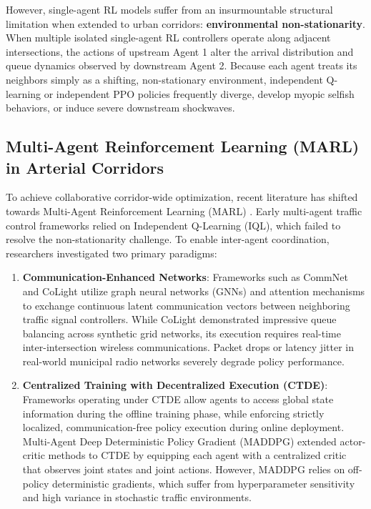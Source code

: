 However, single-agent RL models suffer from an insurmountable structural limitation when extended to urban corridors: \textbf{environmental non-stationarity}. When multiple isolated single-agent RL controllers operate along adjacent intersections, the actions of upstream Agent 1 alter the arrival distribution and queue dynamics observed by downstream Agent 2. Because each agent treats its neighbors simply as a shifting, non-stationary environment, independent Q-learning or independent PPO policies frequently diverge, develop myopic selfish behaviors, or induce severe downstream shockwaves.

\subsection{Multi-Agent Reinforcement Learning (MARL) in Arterial Corridors}
To achieve collaborative corridor-wide optimization, recent literature has shifted towards Multi-Agent Reinforcement Learning (MARL) \cite{ref_mappo2022}. Early multi-agent traffic control frameworks relied on Independent Q-Learning (IQL), which failed to resolve the non-stationarity challenge. To enable inter-agent coordination, researchers investigated two primary paradigms:
\begin{enumerate}
    \item \textbf{Communication-Enhanced Networks}: Frameworks such as CommNet \cite{ref_sukhbaatar2016} and CoLight \cite{ref_wei2019colight} utilize graph neural networks (GNNs) and attention mechanisms to exchange continuous latent communication vectors between neighboring traffic signal controllers. While CoLight demonstrated impressive queue balancing across synthetic grid networks, its execution requires real-time inter-intersection wireless communications. Packet drops or latency jitter in real-world municipal radio networks severely degrade policy performance.
    \item \textbf{Centralized Training with Decentralized Execution (CTDE)}: Frameworks operating under CTDE allow agents to access global state information during the offline training phase, while enforcing strictly localized, communication-free policy execution during online deployment. Multi-Agent Deep Deterministic Policy Gradient (MADDPG) \cite{ref_lowe2017} extended actor-critic methods to CTDE by equipping each agent with a centralized critic that observes joint states and joint actions. However, MADDPG relies on off-policy deterministic gradients, which suffer from hyperparameter sensitivity and high variance in stochastic traffic environments.
\end{enumerate}

